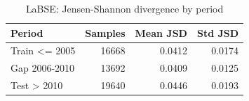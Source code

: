 \begin{table}[ht]
\centering
\caption{LaBSE: Jensen-Shannon divergence by period}
\label{tab:labse_period_jsd_summary}
\begin{tabular}{lrrr}
\toprule
Period & Samples & Mean JSD & Std JSD \\
\midrule
Train <= 2005 & 16668 & 0.0412 & 0.0174 \\
Gap 2006-2010 & 13692 & 0.0409 & 0.0125 \\
Test > 2010 & 19640 & 0.0446 & 0.0193 \\
\bottomrule
\end{tabular}
\end{table}
